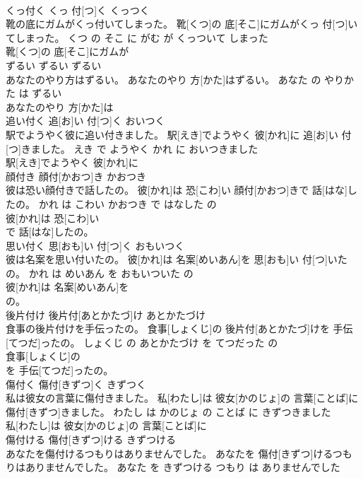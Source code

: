 \documentclass[8pt]{extreport}
\begin{document}
\begin{CJK}{UTF8}{min}
\\	くっ付く	くっ 付[つ]く	くっつく	
\\	靴の底にガムがくっ付いてしまった。	靴[くつ]の 底[そこ]にガムがくっ 付[つ]いてしまった。	くつ の そこ に がむ が くっついて しまった	
\\	靴[くつ]の 底[そこ]にガムが
\\	ずるい	ずるい	ずるい	
\\	あなたのやり方はずるい。	あなたのやり 方[かた]はずるい。	あなた の やりかた は ずるい	
\\	あなたのやり 方[かた]は
\\	追い付く	追[お]い 付[つ]く	おいつく	
\\	駅でようやく彼に追い付きました。	駅[えき]でようやく 彼[かれ]に 追[お]い 付[つ]きました。	えき で ようやく かれ に おいつきました	
\\	駅[えき]でようやく 彼[かれ]に
\\	顔付き	顔付[かおつ]き	かおつき	
\\	彼は恐い顔付きで話したの。	彼[かれ]は 恐[こわ]い 顔付[かおつ]きで 話[はな]したの。	かれ は こわい かおつき で はなした の	
\\	彼[かれ]は 恐[こわ]い
\\	で 話[はな]したの。			
\\	思い付く	思[おも]い 付[つ]く	おもいつく	
\\	彼は名案を思い付いたの。	彼[かれ]は 名案[めいあん]を 思[おも]い 付[つ]いたの。	かれ は めいあん を おもいついた の	
\\	彼[かれ]は 名案[めいあん]を
\\	の。			
\\	後片付け	後片付[あとかたづ]け	あとかたづけ	
\\	食事の後片付けを手伝ったの。	食事[しょくじ]の 後片付[あとかたづ]けを 手伝[てつだ]ったの。	しょくじ の あとかたづけ を てつだった の	
\\	食事[しょくじ]の
\\	を 手伝[てつだ]ったの。			
\\	傷付く	傷付[きずつ]く	きずつく	
\\	私は彼女の言葉に傷付きました。	私[わたし]は 彼女[かのじょ]の 言葉[ことば]に 傷付[きずつ]きました。	わたし は かのじょ の ことば に きずつきました	
\\	私[わたし]は 彼女[かのじょ]の 言葉[ことば]に
\\	傷付ける	傷付[きずつ]ける	きずつける	
\\	あなたを傷付けるつもりはありませんでした。	あなたを 傷付[きずつ]けるつもりはありませんでした。	あなた を きずつける つもり は ありませんでした	

\end{CJK}
\end{document}
